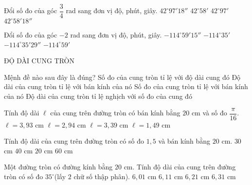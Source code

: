\begin{ex}%
Đổi số đo của góc $\dfrac{3}{4}$ rad sang đơn vị độ, phút, giây.
\choice
{$42^{\circ}9{7}'1{8}''$}
{$42^{\circ}5{8}'$}
{$42^{\circ}9{7}'$}
{\True $42^{\circ}5{8}'1{8}''$}
\end{ex}

\begin{ex}%
Đổi số đo của góc $-2$ rad sang đơn vị độ, phút, giây.
\choice
{$-114^{\circ}5{9}'1{5}''$}
{$-114^{\circ}3{5}'$}
{\True $-114^{\circ}3{5}'2{9}''$}
{$-114^{\circ}5{9}'$}
\end{ex}

\begin{dang}
    { ĐỘ DÀI CUNG TRÒN}
\end{dang}

\begin{ex}%
Mệnh đề nào sau đây là đúng?
\choice
{\True Số đo của cung tròn tỉ lệ với độ dài cung đó}
{Độ dài của cung tròn tỉ lệ với bán kính của nó}
{Số đo của cung tròn tỉ lệ với bán kính của nó}
{Độ dài của cung tròn tỉ lệ nghịch với số đo của cung đó}
\end{ex}

\begin{ex}%
Tính độ dài $\ell $ của cung trên đường tròn có bán kính bằng $20$ cm và số đo $\dfrac{\pi}{16}.$
\choice
{\True $\ell =3{,}93$ cm}
{$\ell =2{,}94$ cm}
{$\ell =3{,}39$ cm}
{$\ell =1{,}49$ cm}
\end{ex}

\begin{ex}%
Tính độ dài của cung trên đường tròn có số đo $1{,}5$ và bán kính bằng $20$ cm.
\choice
{\True $30$ cm}
{$40$ cm}
{$20$ cm}
{$60$ cm}
\end{ex}

\begin{ex}%
Một đường tròn có đường kính bằng $20$ cm. Tính độ dài của cung trên đường tròn có số đo $35^{\circ}$(lấy $2$ chữ số thập phân).
\choice
{$6{,}01$ cm}
{\True $6{,}11$ cm}
{$6{,}21$ cm}
{$6{,}31$ cm}
\end{ex}

